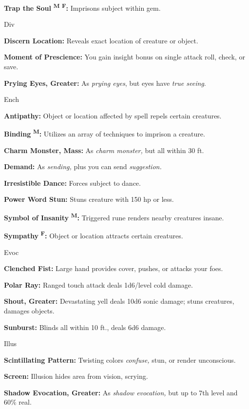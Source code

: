 \documentclass{article}
\begin{document}
\textbf{Trap the Soul }\textsuperscript{\textbf{M}}{\scriptsize{}\textbf{ }}\textsuperscript{\textbf{F}}\textbf{:} 
Imprisons subject within gem.

Div

\textbf{Discern Location:} Reveals exact location of creature or object.

\textbf{Moment of Prescience:} You gain insight bonus on single attack roll, check, 
or save.

\textbf{Prying Eyes, Greater:} As \textit{prying eyes}, but eyes have \textit{true 
seeing}.

Ench

\textbf{Antipathy:} Object or location affected by spell repels certain creatures.

\textbf{Binding }\textsuperscript{\textbf{M}}\textbf{:} Utilizes an array of techniques 
to imprison a creature.

\textbf{Charm Monster, Mass:} As \textit{charm monster, }but all within 30 ft.

\textbf{Demand:} As \textit{sending, }plus you can send \textit{suggestion.}

\textbf{Irresistible Dance:} Forces subject to dance.

\textbf{Power Word Stun:} Stuns creature with 150 hp or less.

\textbf{Symbol of Insanity }\textsuperscript{\textbf{M}}\textbf{:} Triggered rune 
renders nearby creatures insane.

\textbf{Sympathy }\textsuperscript{\textbf{F}}\textbf{:} Object or location attracts 
certain creatures.

Evoc

\textbf{Clenched Fist:} Large hand provides cover, pushes, or attacks your foes.

\textbf{Polar Ray:} Ranged touch attack deals 1d6/level cold damage.

\textbf{Shout, Greater:} Devastating yell deals 10d6 sonic damage; stuns creatures, 
damages objects.

\textbf{Sunburst:} Blinds all within 10 ft., deals 6d6 damage.

Illus

\textbf{Scintillating Pattern:} Twisting colors \textit{confuse, }stun, or render 
unconscious.

\textbf{Screen:} Illusion hides area from vision, scrying.

\textbf{Shadow Evocation, Greater:} As \textit{shadow evocation, }but up to 7th 
level and 60\% real.
\end{document}
